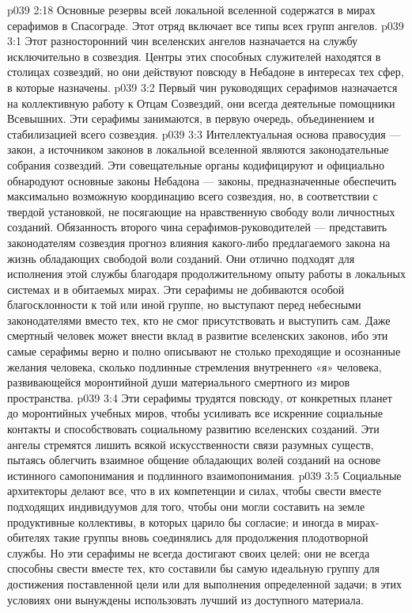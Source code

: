 \vs p039 2:18 \pc Основные резервы всей локальной вселенной содержатся в мирах серафимов в Спасограде. Этот отряд включает все типы всех групп ангелов.
\vs p039 3:1 Этот разносторонний чин вселенских ангелов назначается на службу исключительно в созвездия. Центры этих способных служителей находятся в столицах созвездий, но они действуют повсюду в Небадоне в интересах тех сфер, в которые назначены.
\vs p039 3:2 \bibnobreakspace {} Первый чин руководящих серафимов назначается на коллективную работу к Отцам Созвездий, они всегда деятельные помощники Всевышних. Эти серафимы занимаются, в первую очередь, объединением и стабилизацией всего созвездия.
\vs p039 3:3 \bibnobreakspace {} Интеллектуальная основа правосудия --- закон, а источником законов в локальной вселенной являются законодательные собрания созвездий. Эти совещательные органы кодифицируют и официально обнародуют основные законы Небадона --- законы, предназначенные обеспечить максимально возможную координацию всего созвездия, но, в соответствии с твердой установкой, не посягающие на нравственную свободу воли личностных созданий. Обязанность второго чина серафимов\hyp{}руководителей --- представить законодателям созвездия прогноз влияния какого\hyp{}либо предлагаемого закона на жизнь обладающих свободой воли созданий. Они отлично подходят для исполнения этой службы благодаря продолжительному опыту работы в локальных системах и в обитаемых мирах. Эти серафимы не добиваются особой благосклонности к той или иной группе, но выступают перед небесными законодателями вместо тех, кто не смог присутствовать и выступить сам. Даже смертный человек может внести вклад в развитие вселенских законов, ибо эти самые серафимы верно и полно описывают не столько преходящие и осознанные желания человека, сколько подлинные стремления внутреннего «я» человека, развивающейся моронтийной души материального смертного из миров пространства.
\vs p039 3:4 \bibnobreakspace {} Эти серафимы трудятся повсюду, от конкретных планет до моронтийных учебных миров, чтобы усиливать все искренние социальные контакты и способствовать социальному развитию вселенских созданий. Эти ангелы стремятся лишить всякой искусственности связи разумных существ, пытаясь облегчить взаимное общение обладающих волей созданий на основе истинного самопонимания и подлинного взаимопонимания.
\vs p039 3:5 Социальные архитекторы делают все, что в их компетенции и силах, чтобы свести вместе подходящих индивидуумов для того, чтобы они могли составить на земле продуктивные коллективы, в которых царило бы согласие; и иногда в мирах\hyp{}обителях такие группы вновь соединялись для продолжения плодотворной службы. Но эти серафимы не всегда достигают своих целей; они не всегда способны свести вместе тех, кто составили бы самую идеальную группу для достижения поставленной цели или для выполнения определенной задачи; в этих условиях они вынуждены использовать лучший из доступного материала.
